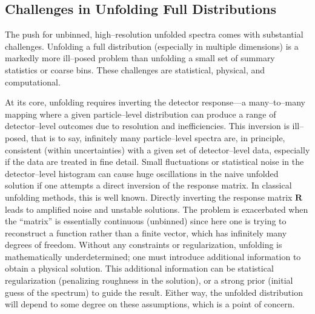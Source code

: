     \subsection{Challenges in Unfolding Full Distributions}
        The push for unbinned, high--resolution unfolded spectra comes with substantial challenges.
        Unfolding a full distribution (especially in multiple dimensions) is a markedly more ill--posed problem than unfolding a small set of summary statistics or coarse bins.
        These challenges are statistical, physical, and computational.

        At its core, unfolding requires inverting the detector response---a many--to--many mapping where a given particle--level distribution can produce a range of detector--level outcomes due to resolution and inefficiencies.
        This inversion is ill--posed, that is to say, infinitely many particle--level spectra are, in principle, consistent (within uncertainties) with a given set of detector--level data, especially if the data are treated in fine detail.
        Small fluctuations or statistical noise in the detector--level histogram can cause huge oscillations in the naive unfolded solution if one attempts a direct inversion of the response matrix.
        In classical unfolding methods, this is well known.
        Directly inverting the response matrix $\mathbf{R}$ leads to amplified noise and unstable solutions.
        The problem is exacerbated when the “matrix” is essentially continuous (unbinned) since here one is trying to reconstruct a function rather than a finite vector, which has infinitely many degrees of freedom.
        Without any constraints or regularization, unfolding is mathematically underdetermined; one must introduce additional information to obtain a physical solution.
        This additional information can be statistical regularization (penalizing roughness in the solution), or a strong prior (initial guess of the spectrum) to guide the result.
        Either way, the unfolded distribution will depend to some degree on these assumptions, which is a point of concern.


